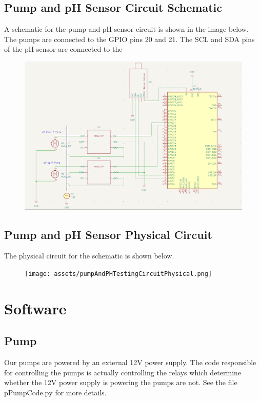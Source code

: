 \documentclass{article}
\begin{document}
        \subsection{Pump and pH Sensor Circuit Schematic}
            \begin{flushleft}
                A schematic for the pump and pH sensor circuit is shown in the image below. The pumps are connected to the GPIO pins 20 and 21. The SCL and SDA pins of the pH sensor are connected to the 
                \begin{figure}[!hbt]
                    \centering
                    \includegraphics[width=0.50\linewidth]{assets/pumpAndPHTestingCircuitSchematic.png} %
                \end{figure}
            \end{flushleft}
        \subsection{Pump and pH Sensor Physical Circuit}
            \begin{flushleft}
                The physical circuit for the schematic is shown below.
                \begin{figure}[!hbt]
                    \centering
                    \texttt{[image: assets/pumpAndPHTestingCircuitPhysical.png]} %
                \end{figure}
            \end{flushleft}
        \newpage
    \section{Software}
        \subsection{Pump}
            \begin{flushleft}
                Our pumps are powered by an external 12V power supply. The code responsible for controlling the pumps is actually controlling the relays which determine whether the 12V power supply is powering the pumps are not. See the file $\text{pPumpCode.py}$ for more details.
            \end{flushleft}
\end{document}
